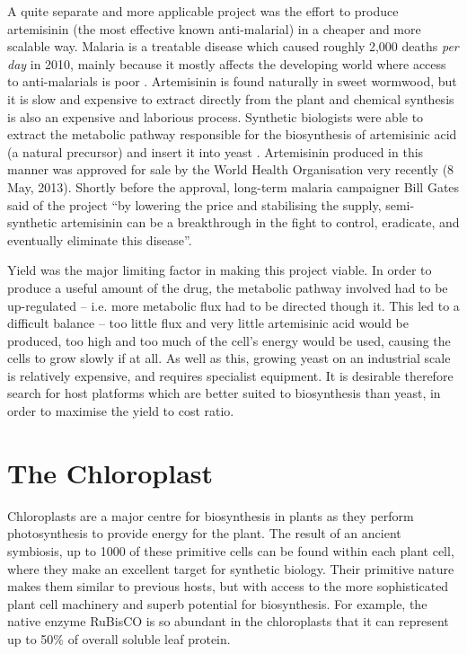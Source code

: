 A quite separate and more applicable project was the effort to produce 
artemisinin (the most effective known anti-malarial) in a cheaper and more 
scalable way.
Malaria is a treatable disease which caused roughly 2,000 deaths 
\emph{per day} in 2010, mainly because it mostly affects the developing world 
where access to anti-malarials is poor \citep{malaria}.
Artemisinin is found naturally in sweet wormwood, but it is slow and expensive
to extract directly from the plant and chemical synthesis is also an expensive
and laborious process.
Synthetic biologists were able to extract the metabolic pathway responsible for
the biosynthesis of artemisinic acid (a natural precursor) and insert it into 
yeast \citep{yeast}.
Artemisinin produced in this manner was approved for sale by the World Health
Organisation very recently (8 May, 2013).
Shortly before the approval, long-term malaria campaigner Bill Gates said of 
the project
``by lowering the price and stabilising the supply, semi-synthetic artemisinin
can be a breakthrough in the fight to control, eradicate, and eventually
eliminate this disease''.

Yield was the major limiting factor in making this project viable.
In order to produce a useful amount of the drug, the metabolic pathway 
involved had to be up-regulated -- i.e. more metabolic flux had to be directed 
though it.
This led to a difficult balance -- too little flux and very little
artemisinic acid would be produced, too high and too much of the cell's
energy would be used, causing the cells to grow slowly if at all.
As well as this, growing yeast on an industrial scale is relatively expensive,
and requires specialist equipment.
It is desirable therefore search for host platforms which are better suited to
biosynthesis than yeast, in order to maximise the yield to cost ratio.

\section{The Chloroplast}
\label{sec:intro_chloroplast}

Chloroplasts are a major centre for biosynthesis in plants as they perform
photosynthesis to provide energy for the plant.
The result of an ancient symbiosis, up to 1000 of these primitive cells can be 
found within each plant cell, where they make an excellent target for synthetic
biology.
Their primitive nature makes them similar to previous hosts, 
but with access to the more sophisticated plant cell machinery and 
superb potential for biosynthesis.
For example, the native enzyme RuBisCO is so abundant in the chloroplasts that 
it can represent up to 50\% of overall soluble leaf protein.

